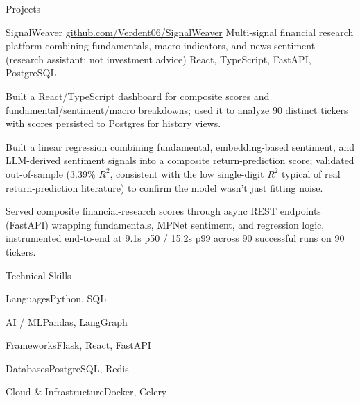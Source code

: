 \documentclass[
	11pt
]{../../../template}
\begin{document}
	\begin{rSection}{P}{rojects}
		\begin{rSectionEntry}
			{SignalWeaver}
			{\href{https://github.com/Verdent06/SignalWeaver}{github.com/Verdent06/SignalWeaver}}
			{Multi-signal financial research platform combining fundamentals, macro indicators, and news sentiment (research assistant; not investment advice)}
			{React, TypeScript, FastAPI, PostgreSQL}
			{}

			\item Built a React/TypeScript dashboard for composite scores and fundamental/sentiment/macro breakdowns; used it to analyze 90 distinct tickers with scores persisted to Postgres for history views.
			\item Built a linear regression combining fundamental, embedding-based sentiment, and LLM-derived sentiment signals into a composite return-prediction score; validated out-of-sample (3.39\% $R^{2}$, consistent with the low single-digit $R^{2}$ typical of real return-prediction literature) to confirm the model wasn't just fitting noise.
			\item Served composite financial-research scores through async REST endpoints (FastAPI) wrapping fundamentals, MPNet sentiment, and regression logic, instrumented end-to-end at 9.1s p50 / 15.2s p99 across 90 successful runs on 90 tickers.
		\end{rSectionEntry}
	\end{rSection}

	\begin{rSection}{T}{echnical Skills}
		\begin{rSet}{Languages}{Python, SQL}
		\end{rSet}
		\begin{rSet}{AI / ML}{Pandas, LangGraph}
		\end{rSet}
		\begin{rSet}{Frameworks}{Flask, React, FastAPI}
		\end{rSet}
		\begin{rSet}{Databases}{PostgreSQL, Redis}
		\end{rSet}
		\begin{rSet}{Cloud \& Infrastructure}{Docker, Celery}
		\end{rSet}
	\end{rSection}
\end{document}
